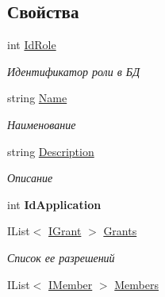 \subsection*{Свойства}
\begin{DoxyCompactItemize}
\item 
int \hyperlink{interface_security_1_1_interfaces_1_1_model_1_1_i_role_a22a4365570974829a0aa04dde23cf64f}{Id\+Role}
\begin{DoxyCompactList}\small\item\em Идентификатор роли в БД \end{DoxyCompactList}\item 
string \hyperlink{interface_security_1_1_interfaces_1_1_model_1_1_i_role_a30342eb8535f6c5f9a268581029ea756}{Name}
\begin{DoxyCompactList}\small\item\em Наименование \end{DoxyCompactList}\item 
string \hyperlink{interface_security_1_1_interfaces_1_1_model_1_1_i_role_af765b879a0d7378e8737d4e262c8c6cd}{Description}
\begin{DoxyCompactList}\small\item\em Описание \end{DoxyCompactList}\item 
\mbox{\label{interface_security_1_1_interfaces_1_1_model_1_1_i_role_aec0d3924aabc0d1a5ee198ce786be21f}} 
int {\bfseries Id\+Application}
\item 
I\+List$<$ \hyperlink{interface_security_1_1_interfaces_1_1_model_1_1_i_grant}{I\+Grant} $>$ \hyperlink{interface_security_1_1_interfaces_1_1_model_1_1_i_role_a3ce53067b9cb4f80be82c3c5192656d0}{Grants}
\begin{DoxyCompactList}\small\item\em Список ее разрешений \end{DoxyCompactList}\item 
I\+List$<$ \hyperlink{interface_security_1_1_interfaces_1_1_model_1_1_i_member}{I\+Member} $>$ \hyperlink{interface_security_1_1_interfaces_1_1_model_1_1_i_role_a983f3e9495d2d6a6e9524c2668c3f56f}{Members}

\end{DoxyCompactItemize}

